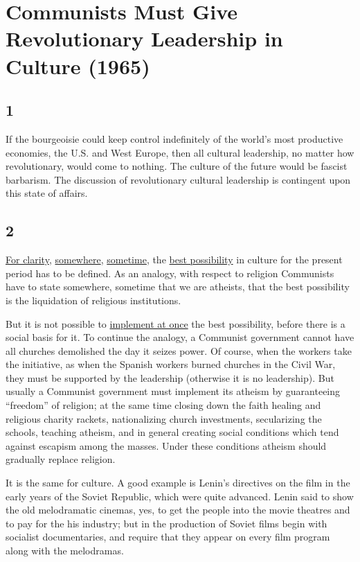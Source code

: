 \chapter{Communists Must Give Revolutionary Leadership in Culture (1965)}

\section*{1\hfill}

If the bourgeoisie could keep control indefinitely of the world's most productive 
economies, the U.S. and West Europe, then all cultural leadership, no matter how 
revolutionary, would come to nothing. The culture of the future would be fascist 
barbarism. The discussion of revolutionary cultural leadership is contingent upon 
this state of affairs. 

\section*{2}

\uline{For clarity}, \uline{somewhere}, \uline{sometime}, the \uline{best 
possibility} in culture for the present period has to be defined. As an analogy,
with respect to religion Communists have to state somewhere, sometime that we
are atheists, that the best possibility is the liquidation of religious 
institutions. 

But it is not possible to \uline{implement at once} the best possibility,
before there is a social basis for it. To continue the analogy, a Communist
government cannot have all churches demolished the day it seizes power. Of 
course, when the workers take the initiative, as when the Spanish workers 
burned churches in the Civil War, they must be supported by the leadership
(otherwise it is no leadership). But usually a Communist government must
implement its atheism by guaranteeing \enquote{freedom} of religion; at the same
time closing down the faith healing and religious charity rackets, 
nationalizing church investments, secularizing the schools, teaching atheism,
and in general creating social conditions which tend against escapism among the
masses. Under these conditions atheism should gradually replace religion.

It is the same for culture. A good example is Lenin's directives on the film in
the early years of the Soviet Republic, which were quite advanced. Lenin said to
show the old melodramatic cinemas, yes, to get the people into the movie theatres
and to pay for the his industry; but in the production of Soviet films begin with
socialist documentaries, and require that they appear on every film program along
with the melodramas. 

